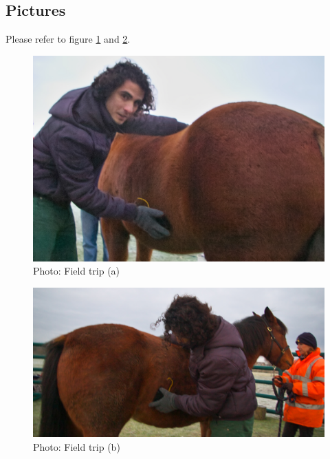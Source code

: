 \subsection{Pictures}
Please refer to figure \ref{fig:field_trip_a} and \ref{fig:field_trip_b}.
\begin{figure}[htb]
\centering
\includegraphics[width=0.7\columnwidth]{Images/field_trip_a.jpg}
\caption{Photo: Field trip (a)}
\label{fig:field_trip_a}
\end{figure}
\begin{figure}[htb]
\centering
\includegraphics[width=0.7\columnwidth]{Images/field_trip_b.jpg}
\caption{Photo: Field trip (b)}
\label{fig:field_trip_b}
\end{figure}


